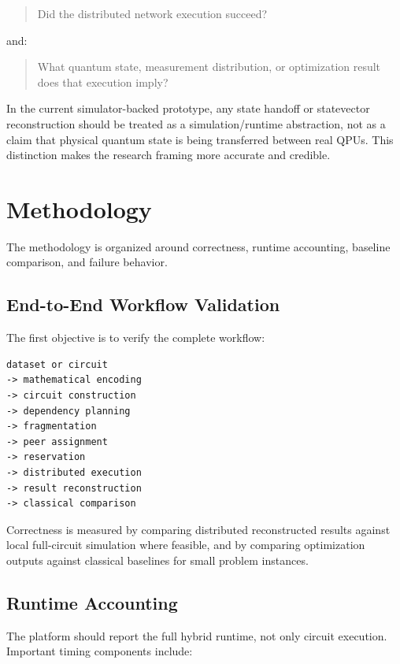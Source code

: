 \documentclass[11pt]{article}
\begin{document}
\begin{quote}
Did the distributed network execution succeed?
\end{quote}

and:

\begin{quote}
What quantum state, measurement distribution, or optimization result does that execution imply?
\end{quote}

In the current simulator-backed prototype, any state handoff or statevector reconstruction should be treated as a simulation/runtime abstraction, not as a claim that physical quantum state is being transferred between real QPUs. This distinction makes the research framing more accurate and credible.

\section{Methodology}

The methodology is organized around correctness, runtime accounting, baseline comparison, and failure behavior.

\subsection{End-to-End Workflow Validation}

The first objective is to verify the complete workflow:

\begin{lstlisting}[style=codestyle,caption={Workflow sketch.}]
dataset or circuit
-> mathematical encoding
-> circuit construction
-> dependency planning
-> fragmentation
-> peer assignment
-> reservation
-> distributed execution
-> result reconstruction
-> classical comparison
\end{lstlisting}

Correctness is measured by comparing distributed reconstructed results against local full-circuit simulation where feasible, and by comparing optimization outputs against classical baselines for small problem instances.

\subsection{Runtime Accounting}

The platform should report the full hybrid runtime, not only circuit execution. Important timing components include:
\end{document}
